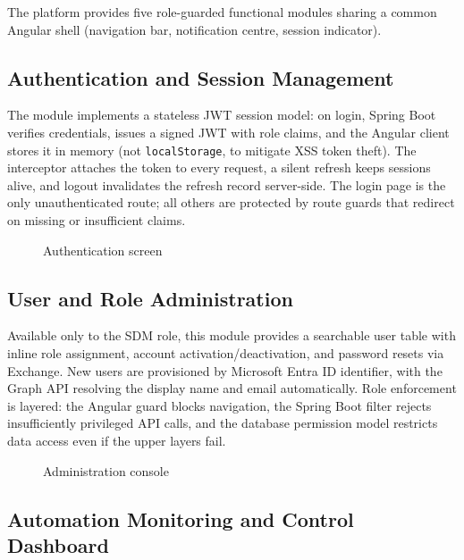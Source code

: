 The platform provides five role-guarded functional modules sharing a common Angular shell (navigation bar, notification centre, session indicator).

\subsection{Authentication and Session Management}

The module implements a stateless JWT session model: on login, Spring Boot verifies credentials, issues a signed JWT with role claims, and the Angular client stores it in memory (not \texttt{localStorage}, to mitigate XSS token theft). The interceptor attaches the token to every request, a silent refresh keeps sessions alive, and logout invalidates the refresh record server-side. The login page is the only unauthenticated route; all others are protected by route guards that redirect on missing or insufficient claims.

\begin{figure}[H]
  \centering
  \caption{Authentication screen}
  \label{fig:login-screenshot}
\end{figure}

\subsection{User and Role Administration}

Available only to the SDM role, this module provides a searchable user table with inline role assignment, account activation/deactivation, and password resets via Exchange. New users are provisioned by Microsoft Entra ID identifier, with the Graph API resolving the display name and email automatically. Role enforcement is layered: the Angular guard blocks navigation, the Spring Boot filter rejects insufficiently privileged API calls, and the database permission model restricts data access even if the upper layers fail.

\begin{figure}[H]
  \centering
  \caption{Administration console}
  \label{fig:admin-screenshot}
\end{figure}

\subsection{Automation Monitoring and Control Dashboard}

